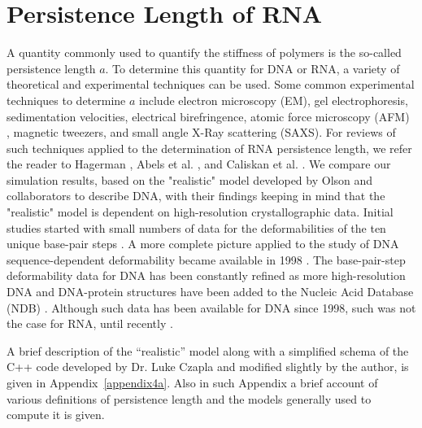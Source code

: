 \section{Persistence Length of RNA}
A quantity commonly used to  quantify the stiffness of polymers is the
so-called persistence  length $a$. To determine this  quantity for DNA
or RNA,  a variety of  theoretical and experimental techniques  can be
used.  Some  common experimental  techniques to determine  $a$ include
electron   microscopy   (EM),   gel   electrophoresis,   sedimentation
velocities, electrical birefringence,  atomic force microscopy (AFM) ,
magnetic  tweezers,  and small  angle  X-Ray  scattering (SAXS).   For
reviews  of  such  techniques  applied  to the  determination  of  RNA
persistence    length,    we   refer    the    reader   to    Hagerman
\cite{hagerman1997}, Abels  et al.  \cite{abels2005},  and Caliskan et
al.  \cite{caliskan2005}.  We compare our simulation results, based on
the   "realistic"   model  developed   by   Olson  and   collaborators
\cite{olson1995} to describe DNA,  with their findings keeping in mind
that   the   "realistic"  model   is   dependent  on   high-resolution
crystallographic data.  Initial studies  started with small numbers of
data  for  the  deformabilities  of  the ten  unique  base-pair  steps
\cite{olson1995}.  A more complete picture applied to the study of DNA
sequence-dependent    deformability   became    available    in   1998
\cite{olson1998}.  The  base-pair-step deformability data  for DNA has
been constantly  refined as  more high-resolution DNA  and DNA-protein
structures  have  been  added  to  the  Nucleic  Acid  Database  (NDB)
\cite{balasubramanian2009}.  Although such data has been available for
DNA  since  1998,  such was  not  the  case  for RNA,  until  recently
\cite{olson2009}.

A brief description of the ``realistic'' model along with a simplified
schema  of the  C++ code  developed by  Dr. Luke  Czapla  and modified
slightly by  the author, is given  in Appendix~\ref{appendix4a}.  Also
in such Appendix a brief account of various definitions of persistence
length and the models generally used to compute it is given.

